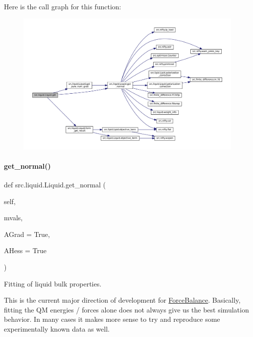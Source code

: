 Here is the call graph for this function\+:
\nopagebreak
\begin{figure}[H]
\begin{center}
\leavevmode
\includegraphics[width=350pt]{classsrc_1_1liquid_1_1Liquid_ad55246e641f979a22458c645c362abbe_cgraph}
\end{center}
\end{figure}
\mbox{\label{classsrc_1_1liquid_1_1Liquid_ae6a946b860b70f1b002acdff15fdb023}} 
\paragraph{\texorpdfstring{get\+\_\+normal()}{get\_normal()}}
{\footnotesize\ttfamily def src.\+liquid.\+Liquid.\+get\+\_\+normal (\begin{DoxyParamCaption}\item[{}]{self,  }\item[{}]{mvals,  }\item[{}]{A\+Grad = {\ttfamily True},  }\item[{}]{A\+Hess = {\ttfamily True} }\end{DoxyParamCaption})}



Fitting of liquid bulk properties. 

This is the current major direction of development for \hyperlink{namespaceForceBalance}{Force\+Balance}. Basically, fitting the QM energies / forces alone does not always give us the best simulation behavior. In many cases it makes more sense to try and reproduce some experimentally known data as well.

